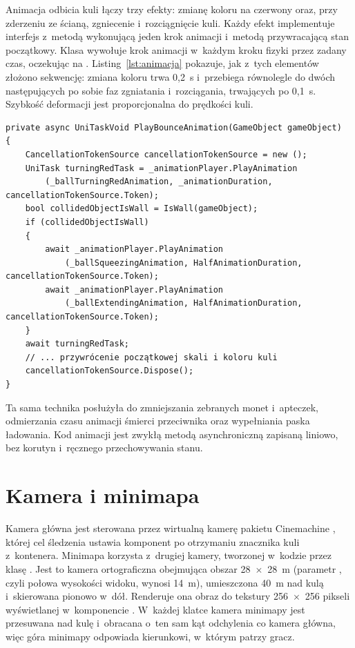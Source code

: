 Animacja odbicia kuli łączy trzy efekty: zmianę koloru na czerwony oraz, przy zderzeniu ze
ścianą, zgniecenie i~rozciągnięcie kuli. Każdy efekt implementuje interfejs
 z~metodą wykonującą jeden krok animacji i~metodą przywracającą stan
początkowy. Klasa  wywołuje krok animacji w~każdym kroku fizyki
przez zadany czas, oczekując na . Listing~\ref{lst:animacja}
pokazuje, jak z~tych elementów złożono sekwencję: zmiana koloru trwa 0,2~s i~przebiega
równolegle do dwóch następujących po sobie faz zgniatania i~rozciągania, trwających po
0,1~s. Szybkość deformacji jest proporcjonalna do prędkości kuli.

\begin{lstlisting}[caption={Sekwencja animacji odbicia w~klasie BounceAnimationLogic; \zrodloWlasne},label=lst:animacja]
private async UniTaskVoid PlayBounceAnimation(GameObject gameObject)
{
    CancellationTokenSource cancellationTokenSource = new ();
    UniTask turningRedTask = _animationPlayer.PlayAnimation
        (_ballTurningRedAnimation, _animationDuration, cancellationTokenSource.Token);
    bool collidedObjectIsWall = IsWall(gameObject);
    if (collidedObjectIsWall)
    {
        await _animationPlayer.PlayAnimation
            (_ballSqueezingAnimation, HalfAnimationDuration, cancellationTokenSource.Token);
        await _animationPlayer.PlayAnimation
            (_ballExtendingAnimation, HalfAnimationDuration, cancellationTokenSource.Token);
    }
    await turningRedTask;
    // ... przywrócenie początkowej skali i koloru kuli
    cancellationTokenSource.Dispose();
}
\end{lstlisting}

Ta sama technika posłużyła do zmniejszania zebranych monet i~apteczek, odmierzania czasu
animacji śmierci przeciwnika oraz wypełniania paska ładowania. Kod animacji jest zwykłą
metodą asynchroniczną zapisaną liniowo, bez korutyn i~ręcznego przechowywania stanu.

\section{Kamera i minimapa}

Kamera główna jest sterowana przez wirtualną kamerę pakietu Cinemachine \cite{cinemachine},
której cel śledzenia ustawia komponent  po otrzymaniu znacznika kuli
z~kontenera. Minimapa korzysta z~drugiej kamery, tworzonej w~kodzie przez klasę
. Jest to kamera ortograficzna obejmująca obszar 28~$\times$~28~m
(parametr , czyli połowa wysokości widoku, wynosi 14~m), umieszczona
40~m nad kulą i~skierowana pionowo w~dół. Renderuje ona obraz do tekstury
256~$\times$~256 pikseli wyświetlanej w~komponencie . W~każdej klatce kamera minimapy jest
przesuwana nad kulę i~obracana o~ten sam kąt odchylenia co kamera główna, więc góra
minimapy odpowiada kierunkowi, w~którym patrzy gracz.

